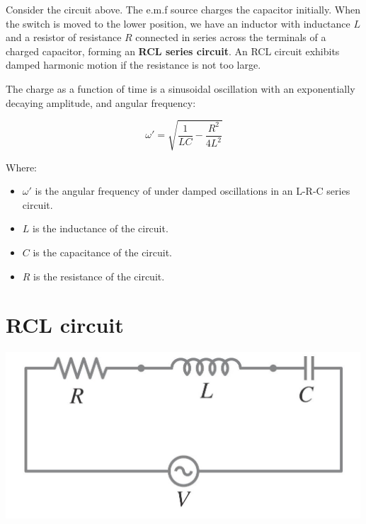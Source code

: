 \documentclass[11pt]{article}
\begin{document}
Consider the circuit above. The e.m.f source charges the capacitor initially. When the switch is moved to the lower position, we have an inductor with inductance \(L\) and a resistor of resistance \(R\) connected in series across the terminals of a charged capacitor, forming an \textbf{RCL series circuit}. An RCL circuit exhibits damped harmonic motion if the resistance is not too large.


The charge as a function of time is a sinusoidal oscillation with an exponentially decaying amplitude, and angular frequency:

\[\omega ' = \sqrt{\frac{1}{LC} - \frac{R^2}{4L^2}}\]

Where:
\begin{itemize}
\item \(\omega '\) is the angular frequency of under damped oscillations in an L-R-C series circuit.
\item \(L\) is the inductance of the circuit.
\item \(C\) is the capacitance of the circuit.
\item \(R\) is the resistance of the circuit.
\end{itemize}
\section{RCL circuit}
\label{sec:org3c26b60}
\begin{center}
\includegraphics[width=.9\linewidth]{./images/rcl-circuit-with-source.png}
\end{center}
\end{document}
